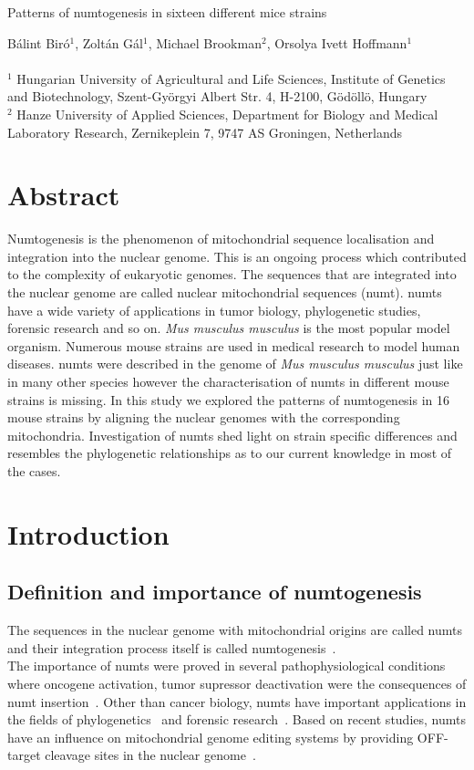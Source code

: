 \documentclass[a4paper,12pt]{article}
\numberwithin{equation}{section} %
\begin{document}
\begin{center}
	\Large{Patterns of numtogenesis in sixteen different mice strains}
\end{center}
\small{Bálint Biró$^1$, Zoltán Gál$^1$, Michael Brookman$^2$, Orsolya Ivett Hoffmann$^1$}\\ \\
\scriptsize{$^1$ Hungarian University of Agricultural and Life Sciences, Institute of Genetics and Biotechnology, Szent-Györgyi Albert Str. 4, H-2100, Gödöllö, Hungary\\
$^2$ Hanze University of Applied Sciences, Department for Biology and Medical Laboratory Research, Zernikeplein 7, 9747 AS Groningen, Netherlands}

\normalsize
\section{Abstract}
\indent Numtogenesis is the phenomenon of mitochondrial sequence localisation and integration into the nuclear genome. This is an ongoing process which contributed to the complexity of eukaryotic genomes. The sequences that are integrated into the nuclear genome are called nuclear mitochondrial sequences (numt). numts have a wide variety of applications in tumor biology, phylogenetic studies, forensic research and so on. \textit{Mus musculus musculus} is the most popular model organism. Numerous mouse strains are used in medical research to model human diseases. numts were described in the genome of  \textit{Mus musculus musculus} just like in many other species however the characterisation of  numts in different mouse strains is missing. In this study we explored the patterns of numtogenesis in 16 mouse strains by aligning the nuclear genomes with the corresponding mitochondria. Investigation of numts shed light on strain specific differences and resembles the phylogenetic relationships as to our current knowledge in most of the cases.
\section{Introduction}
\subsection{Definition and importance of numtogenesis}
\indent The sequences in the nuclear genome with mitochondrial origins are called numts and their integration process itself is called numtogenesis~. \\ \indent The importance of numts were proved in several pathophysiological conditions where oncogene activation, tumor supressor deactivation were the consequences of numt insertion~. Other than cancer biology, numts have important applications in the fields of phylogenetics~ and forensic research~. Based on recent studies, numts have an influence on mitochondrial genome editing systems by providing OFF-target cleavage sites in the nuclear genome~.
\end{document}

